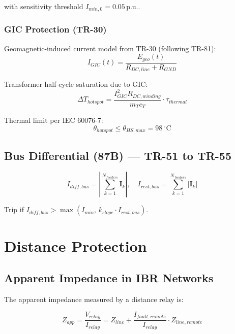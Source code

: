 \documentclass[11pt,a4paper]{report}
\newcommand{\pu}{p.u.}
\newcommand{\bvec}[1]{\mathbf{#1}}
\begin{document}
with sensitivity threshold $I_{min,0} = 0.05$\,\pu{}.

\subsection{GIC Protection (TR-30)}

Geomagnetic-induced current model from TR-30 (following TR-81):
\begin{equation}
\label{eq:gic}
I_{GIC}(t) = \frac{E_{geo}(t)}{R_{DC,line} + R_{GND}}
\end{equation}

Transformer half-cycle saturation due to GIC:
\begin{equation}
\Delta T_{hotspot} = \frac{I_{GIC}^2 R_{DC,winding}}{m_T c_T}\cdot\tau_{thermal}
\end{equation}

Thermal limit per IEC 60076-7:
\begin{equation}
\theta_{hotspot} \leq \theta_{HS,max} = 98\,^\circ\text{C}
\end{equation}

\section{Bus Differential (87B) — TR-51 to TR-55}

\begin{equation}
\label{eq:87b}
I_{diff,bus} = \left|\sum_{k=1}^{N_{feeders}} \bvec{I}_k\right|, \quad
I_{rest,bus} = \sum_{k=1}^{N_{feeders}} |\bvec{I}_k|
\end{equation}

Trip if $I_{diff,bus} > \max(I_{min},\, k_{slope}\cdot I_{rest,bus})$.

\chapter{Distance Protection}
\label{ch:distance}

\section{Apparent Impedance in IBR Networks}

The apparent impedance measured by a distance relay is:

\begin{equation}
\label{eq:apparent_z}
Z_{app} = \frac{V_{relay}}{I_{relay}} = Z_{line} + \frac{I_{fault,remote}}{I_{relay}}\cdot Z_{line,remote}
\end{equation}
\end{document}
